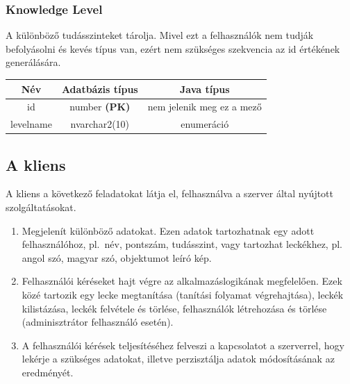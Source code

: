\documentclass[11pt, a4paper]{article}
\begin{document}
    \subsubsection{Knowledge Level}
    A különböző tudásszinteket tárolja. Mivel ezt a felhasználók nem tudják befolyásolni és kevés típus van, ezért nem szükséges szekvencia az id értékének generálására.
    
    \begin{table}[!h]
    	\centering
    	\begin{tabular} {|c|c|c|}
    		\hline
    		Név & Adatbázis típus & Java típus \\
    		\hline
    		id & number \textbf{(PK)} & nem jelenik meg ez a mező \\
    		levelname & nvarchar2(10) & enumeráció \\
    		\hline
    	\end{tabular}
    \end{table}
    
    \subsection{A kliens}
    \label{sec:kliens}
    A kliens a következő feladatokat látja el, felhasználva a szerver által nyújtott szolgáltatásokat.
    \begin{enumerate}
    	\item Megjelenít különböző adatokat. Ezen adatok tartozhatnak egy adott felhasználóhoz, pl.~név, pontszám, tudásszint, vagy tartozhat leckékhez, pl. angol szó, magyar szó, objektumot leíró kép.
    	\item Felhasználói kéréseket hajt végre az alkalmazáslogikának megfelelően. Ezek közé tartozik egy lecke megtanítása (tanítási folyamat végrehajtása), leckék kilistázása, leckék felvétele és törlése, felhasználók létrehozása és törlése (adminisztrátor felhasználó esetén).
    	\item A felhasználói kérések teljesítéséhez felveszi a kapcsolatot a szerverrel, hogy lekérje a szükséges adatokat, illetve perzisztálja adatok módosításának az eredményét.
    \end{enumerate}
\end{document}
